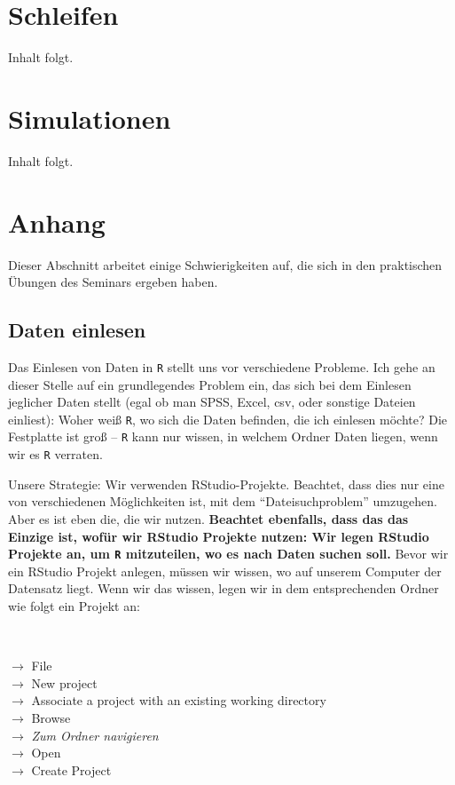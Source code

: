 \documentclass[12pt,]{tufte-book}
\theoremstyle{definition}
\theoremstyle{definition}
\theoremstyle{definition}
\theoremstyle{remark}
\begin{document}
\chapter{Schleifen}\label{schleifen}

Inhalt folgt.

\chapter{Simulationen}\label{simulationen}

Inhalt folgt.

\chapter{Anhang}\label{anhang}

Dieser Abschnitt arbeitet einige Schwierigkeiten auf, die sich in den
praktischen Übungen des Seminars ergeben haben.

\hypertarget{datenEinlesen}{\section{Daten
einlesen}\label{datenEinlesen}}

Das Einlesen von Daten in \texttt{R} stellt uns vor verschiedene
Probleme. Ich gehe an dieser Stelle auf ein grundlegendes Problem ein,
das sich bei dem Einlesen jeglicher Daten stellt (egal ob man SPSS,
Excel, csv, oder sonstige Dateien einliest): Woher weiß \texttt{R}, wo
sich die Daten befinden, die ich einlesen möchte? Die Festplatte ist
groß -- \texttt{R} kann nur wissen, in welchem Ordner Daten liegen, wenn
wir es \texttt{R} verraten.

Unsere Strategie: Wir verwenden RStudio-Projekte. Beachtet, dass dies
nur eine von verschiedenen Möglichkeiten ist, mit dem
``Dateisuchproblem'' umzugehen. Aber es ist eben die, die wir nutzen.
\textbf{Beachtet ebenfalls, dass das das Einzige ist, wofür wir RStudio
Projekte nutzen: Wir legen RStudio Projekte an, um \texttt{R}
mitzuteilen, wo es nach Daten suchen soll.} Bevor wir ein RStudio
Projekt anlegen, müssen wir wissen, wo auf unserem Computer der
Datensatz liegt. Wenn wir das wissen, legen wir in dem entsprechenden
Ordner wie folgt ein Projekt an:

~

\(\to\) File\\
\(\to\) New project\\
\(\to\) Associate a project with an existing working directory\\
\(\to\) Browse\\
\(\to\) \emph{Zum Ordner navigieren}\\
\(\to\) Open\\
\(\to\) Create Project
\end{document}
